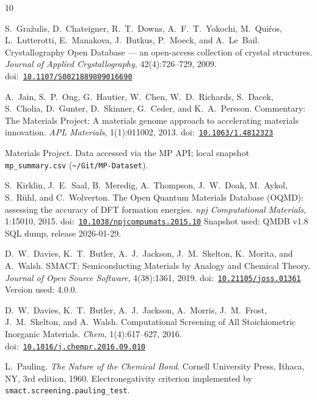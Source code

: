 \documentclass[11pt,a4paper]{article}
\newcommand{\code}[1]{\texttt{#1}}
\begin{document}
\begin{thebibliography}{10}
\providecommand{\doi}[1]{doi:~\href{https://doi.org/#1}{\nolinkurl{#1}}}

S.~Gra\v{z}ulis, D.~Chateigner, R.~T.~Downs, A.~F.~T.~Yokochi, M.~Qui\'{r}os, L.~Lutterotti,
E.~Manakova, J.~Butkus, P.~Moeck, and A.~Le~Bail.
\newblock Crystallography Open Database --- an open-access collection of crystal structures.
\newblock \emph{Journal of Applied Crystallography}, 42(4):726--729, 2009.
\newblock \doi{10.1107/S0021889809016690}

A.~Jain, S.~P.~Ong, G.~Hautier, W.~Chen, W.~D.~Richards, S.~Dacek, S.~Cholia, D.~Gunter,
D.~Skinner, G.~Ceder, and K.~A.~Persson.
\newblock Commentary: The Materials Project: A materials genome approach to accelerating materials
innovation.
\newblock \emph{APL Materials}, 1(1):011002, 2013.
\newblock \doi{10.1063/1.4812323}

Materials Project.
\newblock Data accessed via the MP API; local snapshot \code{mp\_summary.csv}
(\code{\textasciitilde/Git/MP-Dataset}).

S.~Kirklin, J.~E.~Saal, B.~Meredig, A.~Thompson, J.~W.~Doak, M.~Aykol, S.~R\"{u}hl, and
C.~Wolverton.
\newblock The Open Quantum Materials Database (OQMD): assessing the accuracy of DFT formation
energies.
\newblock \emph{npj Computational Materials}, 1:15010, 2015.
\newblock \doi{10.1038/npjcompumats.2015.10}
\newblock Snapshot used: QMDB v1.8 SQL dump, release 2026-01-29.

D.~W.~Davies, K.~T.~Butler, A.~J.~Jackson, J.~M.~Skelton, K.~Morita, and A.~Walsh.
\newblock SMACT: Semiconducting Materials by Analogy and Chemical Theory.
\newblock \emph{Journal of Open Source Software}, 4(38):1361, 2019.
\newblock \doi{10.21105/joss.01361}
\newblock Version used: 4.0.0.

D.~W.~Davies, K.~T.~Butler, A.~J.~Jackson, A.~Morris, J.~M.~Frost, J.~M.~Skelton, and A.~Walsh.
\newblock Computational Screening of All Stoichiometric Inorganic Materials.
\newblock \emph{Chem}, 1(4):617--627, 2016.
\newblock \doi{10.1016/j.chempr.2016.09.010}

L.~Pauling.
\newblock \emph{The Nature of the Chemical Bond}.
\newblock Cornell University Press, Ithaca, NY, 3rd edition, 1960.
\newblock Electronegativity criterion implemented by \code{smact.screening.pauling\_test}.


\end{thebibliography}
\end{document}
